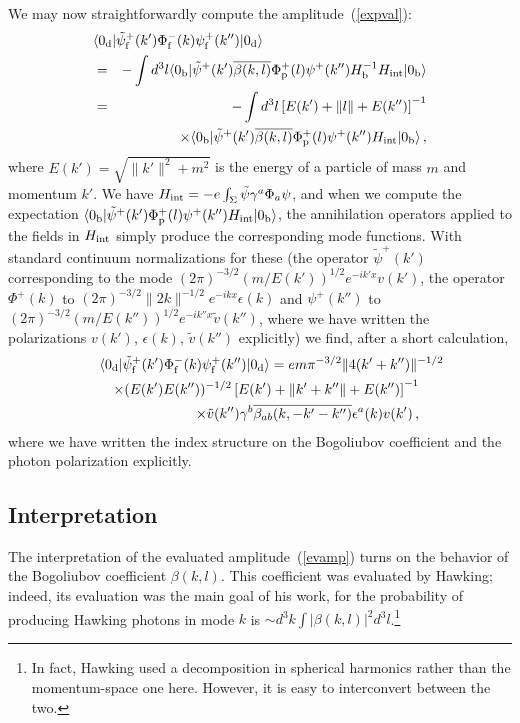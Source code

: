 \documentclass[11pt]{article}
\begin{document}
We may now straightforwardly compute the amplitude~(\ref{expval}):
\begin{eqnarray}
\lefteqn{\langle 0_{\rm d}|{\tilde\psi}^+_{\rm f}(k')\Phi
^-_{\rm f}(k)\psi ^+_{\rm f}(k'')|0_{\rm d}\rangle}\nonumber\\
 &=&
-\int d^3l\langle 0_{\rm b}|{\tilde\psi}^+(k') \overline{\beta (k,l)}
\Phi ^+_{\rm p}
(l)
\psi ^+(k'')H_{\rm b}^{-1}H_{\rm int}|0_{\rm b}\rangle\nonumber\\
 &=&
-\int d^3l\left[ E(k')+\| l\|+ E(k'')\right] ^{-1}\nonumber\\ &&\times
   \langle 0_{\rm b}|{\tilde\psi}^+(k') \overline{\beta (k,l)}\Phi ^+_{\rm p}
(l)
\psi ^+(k'')H_{\rm int}|0_{\rm b}\rangle\, ,
\end{eqnarray}
where $E(k')=\sqrt{\| k'\|^2 +m^2}$ is the energy of a particle of
mass $m$ and momentum $k'$.  
We have
$H_{\rm int}=-e\int _\Sigma\tilde\psi\gamma ^a\Phi _a\psi $, and when we compute
the expectation
$\langle 0_{\rm b}|{\tilde\psi}^+(k') \Phi ^+_{\rm p} (l)
\psi ^+(k'')H_{\rm int}|0_{\rm b}\rangle$, the annihilation operators applied to
the fields in $H_{\rm int}$ simply produce the corresponding mode functions. 
With standard continuum normalizations for these
(the operator
${\tilde\psi}^+(k')$ corresponding to the mode $(2\pi )^{-3/2}
(m/E(k'))^{1/2} e^{-ik'x}
v(k')$, the operator $\Phi ^+(k)$ to $(2\pi )^{-3/2} \| 2k\| ^{-1/2}e^{-ikx}
\epsilon (k)$ and $\psi ^+(k'')$ to $(2\pi )^{-3/2}
(m/E(k''))^{1/2} e^{-ik''x} {\tilde v}(k'')$, where we have written the
polarizations $v(k')$, $\epsilon (k)$, ${\tilde v}(k'')$ explicitly)
we find, after a short calculation,
\begin{eqnarray}\label{evamp}
\lefteqn{\langle 0_{\rm d}|{\tilde\psi}^+_{\rm f}(k')\Phi
^-_{\rm f}(k)\psi ^+_{\rm f}(k'')|0_{\rm d}\rangle
=e m\pi ^{-3/2} \| 4(k'+k'')\| ^{-1/2}}\nonumber\\
&&\times (E(k')E(k''))^{-1/2}
\left[ E(k') +\| k'+k''\| +E(k'')\right]
^{-1} \nonumber\\
&&\times\tilde{v} (k'')\gamma^b
\overline{\beta _{ab}(k,-k'-k'')}\epsilon ^a(k) v(k') \, ,
\end{eqnarray}
where we have written the index structure on the Bogoliubov coefficient 
and the photon polarization explicitly.

\subsection{Interpretation}

The interpretation of the evaluated amplitude~(\ref{evamp})  turns on the
behavior of the Bogoliubov coefficient $\beta (k,l)$.  This coefficient was
evaluated by Hawking; indeed, its evaluation was the main goal of his work, for
the probability of producing Hawking photons in mode $k$ is $\sim d^3k
\int |\beta
(k,l)|^2 d^3l$.\footnote{In fact, Hawking used a decomposition in spherical
harmonics rather than the momentum-space one here.  However, it is easy to
interconvert between the two.}
\end{document}
